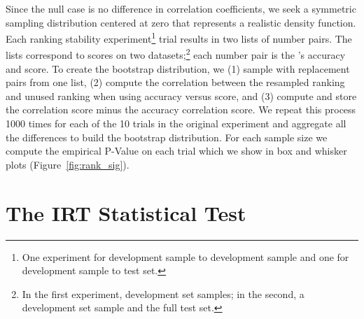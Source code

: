 Since the null case is no difference in correlation coefficients, we seek a symmetric sampling distribution centered at zero that represents a realistic density function.
Each ranking stability experiment\footnote{One experiment for development sample to development sample and one for development sample to test set.} trial results in two lists of number pairs.
The lists correspond to \subj{} scores on two datasets;\footnote{
  In the first experiment, development set samples; in the second, a development set sample and the full test set.
} each number pair is the \subj{}'s accuracy and \irt{} score.
To create the bootstrap distribution, we (1) sample with replacement pairs from one list, (2) compute the correlation between the resampled ranking and unused ranking when using accuracy versus \irt{} score, and (3) compute and store the \irt{} correlation score minus the accuracy correlation score.
We repeat this process 1000 times for each of the 10 trials in the original experiment and aggregate all the differences to build the bootstrap distribution.
For each sample size we compute the empirical P-Value on each trial which we show in box and whisker plots (Figure~\ref{fig:rank_sig}).

\begin{figure*}[t]
  \centering
  \caption{
    P-values of the rank correlation difference for each sample size and trial in Figure~\ref{fig:stability}.
    The inherent noise in dev set sampling makes inferring significance difficult (left); test set driven results (right) are more significant.
  }
  \label{fig:rank_sig}
\end{figure*}


\section{The IRT Statistical Test}
\label{ch:isicle:irt-test}

